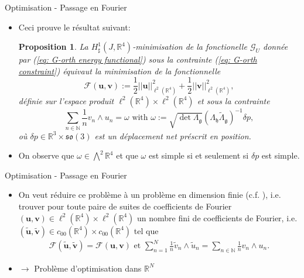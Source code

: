 \documentclass[10pt, envcountsect]{beamer}
\theoremstyle{plain}
\newtheorem{proposition}{Proposition}[section]
\newcommand{\N}{\mathbb{N}}
\newcommand{\R}{\mathbb{R}}
\newcommand{\so}{\mathfrak{so}}
\begin{document}
\begin{frame}{Optimisation - Passage en Fourier}
\begin{itemize}
\item Ceci prouve le résultat suivant:
\begin{proposition}
\label{prop: l2-minimization}
La $H_{\sharp}^1(J, \R^4)$-minimisation de la fonctionelle $\mathcal{G}_U$ donnée par (\ref{eq: G-orth energy functional}) sous la contrainte (\ref{eq: G-orth constraint}) équivaut la minimisation de la fonctionnelle
\begin{equation}
\label{eq:l2-energy}
	\mathcal{F}(\mathbf{u}, \mathbf{v}) := \frac{1}{2} ||\mathbf{u} ||^2_{\ell^2(\R^4)} + \frac{1}{2} ||\mathbf{v}||^2_{\ell^2(\R^4)},
\end{equation}
définie sur l'espace produit $\ell^2(\R^4) \times \ell^2(\R^4)$ et sous la contrainte
\begin{equation}
\label{eq:l2-constraint}
\sum_{n \in \N} \frac{1}{n} v_n \wedge u_n = \omega \text{ with } \omega := \sqrt{\det \Lambda_{\mathfrak{g}}}(\Lambda_{\mathfrak{h}} \tilde{\Lambda}_{\mathfrak{g}})^{-1} \delta p,
\end{equation}
où $\delta p \in \R^3 \times \so(3)$ est un déplacement net préscrit en position.
\end{proposition}

\item On observe que  $\omega \in \bigwedge^2\R^4$ et que $\omega$ est simple si et seulement si $\delta p$ est simple.
\end{itemize}
\end{frame}

\begin{frame}{Optimisation - Passage en Fourier}
\begin{itemize}
\item On veut réduire ce problème à un problème en dimension finie (c.f. \cite{Alouges2017}), i.e. trouver pour toute paire de suites de coefficients de Fourier $(\mathbf{u}, \mathbf{v}) \in \ell^2(\R^4) \times \ell^2(\R^4)$ un nombre fini de coefficients de Fourier, i.e. $(\tilde{\mathbf{u}}, \tilde{\mathbf{v}}) \in c_{00}(\R^4) \times c_{00}(\R^4)$ tel  que
\begin{align}
	\mathcal{F}(\tilde{\mathbf{u}}, \tilde{\mathbf{v}}) = \mathcal{F}(\mathbf{u}, \mathbf{v}) \text{ et }  \sum_{n = 1}^{N} \frac{1}{n} \tilde{v}_n \wedge \tilde{u}_n = \sum_{n \in \N} \frac{1}{n} v_n \wedge u_n.
\end{align}
\item $\to$ Problème d'optimisation dans $\R^N$
\end{itemize}
\end{frame}
\end{document}

